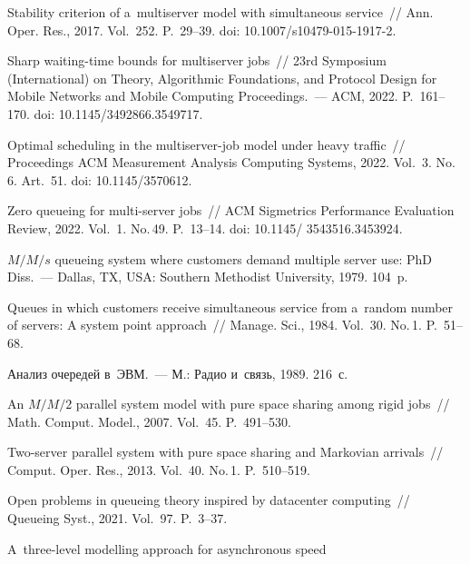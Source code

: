 \begin{multicols}{2}
{{\begin{thebibliography}{99}
 Stability criterion of a~multiserver model with 
simultaneous service~// Ann. Oper. Res., 2017.
Vol.~252. P.~29--39. doi: 10.1007/s10479-015-1917-2.

 Sharp waiting-time bounds for multiserver jobs~// 
23rd  Symposium (International) on Theory, Algorithmic 
Foundations, and Protocol Design for Mobile Networks and Mobile Computing Proceedings.~--- 
ACM, 2022. P.~161--170. doi: 10.1145/3492866.3549717.

  Optimal scheduling in the multiserver-job model under heavy 
traffic~// Proceedings ACM Measurement Analysis Computing Systems, 2022. Vol.~3. No.\,6. Art.~51. 
doi: 10.1145/3570612.

 Zero queueing for multi-server jobs~// 
ACM Sigmetrics Performance Evaluation Review, 2022. Vol.~1. No.\,49. P.~13--14. doi: 
10.1145/ 3543516.3453924.

 ${M/M/s}$ queueing system where customers demand multiple server 
use: PhD Diss.~--- Dallas, TX, USA: Southern Methodist University, 1979. 104~p.


 Queues in which customers receive simultaneous 
service from a~random number of servers: A system point approach~// Manage. Sci.,
1984. Vol.~30. No.\,1. P.~51--68.



 Анализ очередей в~ЭВМ.~--- М.: Радио и~связь, 1989. 216~с.

 An ${M/M/2}$ parallel system model with pure
space sharing among rigid jobs~// Math. Comput. Model.,
2007. Vol.~45. P.~491--530.

 Two-server parallel system with pure 
space sharing and Markovian arrivals~// Comput. Oper. Res., 2013.
Vol.~40. No.\,1. P.~510--519.

 Open problems in queueing theory inspired by datacenter
computing~// Queueing Syst., 2021. Vol.~97. P.~3--37.

 A~three-level modelling approach for asynchronous speed\linebreak\vspace*{-12pt}
 

\end{thebibliography}}}
\end{multicols}
